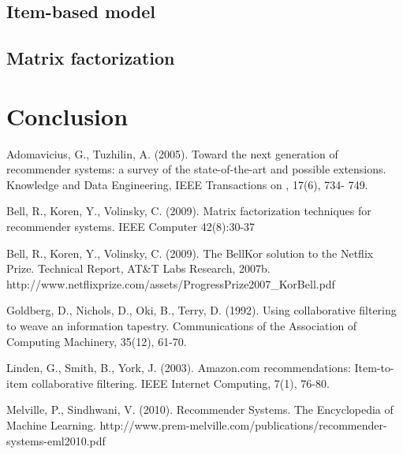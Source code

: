 \documentclass[letterpaper, 10 pt, conference]{ieeeconf}
\begin{document}
\subsection{Item-based model}
\subsection{Matrix factorization}

\section{Conclusion}


\begin{thebibliography}{99}

Adomavicius, G., Tuzhilin, A. (2005). Toward the next generation of recommender systems: a survey of the state-of-the-art and possible extensions. Knowledge and Data Engineering, IEEE Transactions on , 17(6),  734- 749.

Bell, R., Koren, Y., Volinsky, C. (2009). Matrix factorization techniques for recommender systems. IEEE Computer 42(8):30-37

Bell, R., Koren, Y., Volinsky, C. (2009). 
The BellKor solution to the Netﬂix Prize. Technical Report, AT\&T Labs 
Research, 2007b. 
http://www.netflixprize.com/assets/ProgressPrize2007\_KorBell.pdf


Goldberg, D., Nichols, D., Oki, B., Terry, D. (1992). 
Using collaborative filtering to weave an information tapestry. 
Communications of the Association of Computing Machinery, 35(12), 61-70.

Linden, G., Smith, B., York, J. (2003). Amazon.com recommendations: Item-to-item collaborative filtering. IEEE Internet
Computing, 7(1), 76-80.

Melville, P., Sindhwani, V. (2010).
Recommender Systems. The Encyclopedia of Machine Learning. 
http://www.prem-melville.com/publications/recommender-systems-eml2010.pdf

\end{thebibliography}
\end{document}
